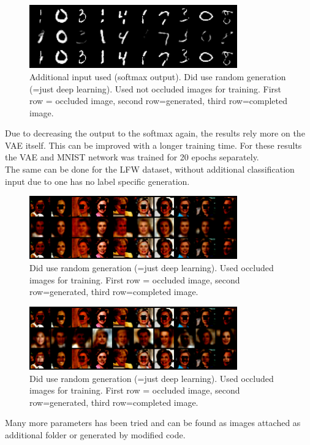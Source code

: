\documentclass[
     11pt,         %
     a4paper,      %
     oneside,
     ]{article}
\begin{document}
\begin{figure}[H]
  \begin{center}
    \includegraphics[width=0.8\textwidth]{presentation_results/VAE/MNIST-VAE-useRandom_true-useMNIST_true-VAERepresentation_3-useOccludedForTrain_false.png}
    \caption{Additional input used (softmax output). Did use random generation (=just deep learning). Used not occluded images for training. First row = occluded image, second row=generated, third row=completed image.}
  \end{center}
\end{figure}
Due to decreasing the output to the softmax again, the results rely more on the VAE itself. This can be improved with a longer training time. For these results the VAE and MNIST network was trained for 20 epochs separately.\\
The same can be done for the LFW dataset, without additional classification input due to one has no label specific generation.
\begin{figure}[H]
  \begin{center}
    \includegraphics[width=0.8\textwidth]{presentation_results/VAE/LFW-VAE-useRandom_false-useOccludedForTrain_True.png}
    \caption{Did use random generation (=just deep learning). Used occluded images for training.  First row = occluded image, second row=generated, third row=completed image.}
  \end{center}
\end{figure}
\begin{figure}[H]
  \begin{center}
    \includegraphics[width=0.8\textwidth]{presentation_results/VAE/LFW-VAE-useRandom_True-useOccludedForTrain_False.png}
    \caption{Did use random generation (=just deep learning). Used occluded images for training.  First row = occluded image, second row=generated, third row=completed image.}
  \end{center}
\end{figure}
 Many more parameters has been tried and can be found as images attached as additional folder or generated by modified code.
\end{document}
